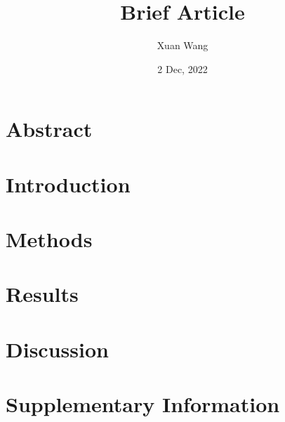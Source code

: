 \documentclass[11pt, oneside]{article}
\title{Brief Article}
\author{Xuan Wang}
\date{2 Dec, 2022}
\begin{document}
\maketitle
\section{Abstract}
\pagebreak
\section{Introduction}
\pagebreak
\section{Methods}
\pagebreak
\section{Results}
\pagebreak
\section{Discussion}
\pagebreak
\section{Supplementary Information}

\end{document}
